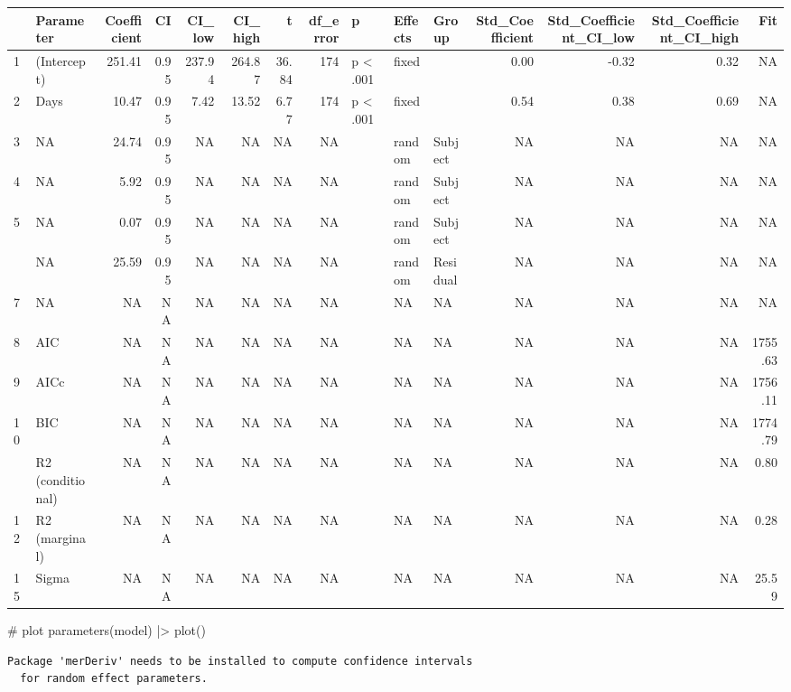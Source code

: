 \documentclass[
  letterpaper,
  DIV=11,
  numbers=noendperiod]{scrreprt}
\newenvironment{Shaded}{\begin{snugshade}}{\end{snugshade}}
\newcommand{\CommentTok}[1]{\textcolor[rgb]{0.37,0.37,0.37}{#1}}
\newcommand{\FunctionTok}[1]{\textcolor[rgb]{0.28,0.35,0.67}{#1}}
\newcommand{\NormalTok}[1]{\textcolor[rgb]{0.00,0.23,0.31}{#1}}
\newcommand{\SpecialCharTok}[1]{\textcolor[rgb]{0.37,0.37,0.37}{#1}}
\begin{document}
\begin{longtable*}[t]{llrrrrrrlllrrrr}
\toprule
 & Parameter & Coefficient & CI & CI\_low & CI\_high & t & df\_error & p & Effects & Group & Std\_Coefficient & Std\_Coefficient\_CI\_low & Std\_Coefficient\_CI\_high & Fit\\
 & (Intercept) & 251.41 & 0.95 & 237.94 & 264.87 & 36.84 & 174 & p < .001 & fixed &  & 0.00 & -0.32 & 0.32 & NA\\
2 & Days & 10.47 & 0.95 & 7.42 & 13.52 & 6.77 & 174 & p < .001 & fixed &  & 0.54 & 0.38 & 0.69 & NA\\
3 & NA & 24.74 & 0.95 & NA & NA & NA & NA &  & random & Subject & NA & NA & NA & NA\\
4 & NA & 5.92 & 0.95 & NA & NA & NA & NA &  & random & Subject & NA & NA & NA & NA\\
5 & NA & 0.07 & 0.95 & NA & NA & NA & NA &  & random & Subject & NA & NA & NA & NA\\
 & NA & 25.59 & 0.95 & NA & NA & NA & NA &  & random & Residual & NA & NA & NA & NA\\
7 & NA & NA & NA & NA & NA & NA & NA &  & NA & NA & NA & NA & NA & NA\\
8 & AIC & NA & NA & NA & NA & NA & NA &  & NA & NA & NA & NA & NA & 1755.63\\
9 & AICc & NA & NA & NA & NA & NA & NA &  & NA & NA & NA & NA & NA & 1756.11\\
10 & BIC & NA & NA & NA & NA & NA & NA &  & NA & NA & NA & NA & NA & 1774.79\\
 & R2 (conditional) & NA & NA & NA & NA & NA & NA &  & NA & NA & NA & NA & NA & 0.80\\
12 & R2 (marginal) & NA & NA & NA & NA & NA & NA &  & NA & NA & NA & NA & NA & 0.28\\
15 & Sigma & NA & NA & NA & NA & NA & NA &  & NA & NA & NA & NA & NA & 25.59\\
\bottomrule
\end{longtable*}

\begin{Shaded}
\begin{Highlighting}[]
\CommentTok{\# plot}
\FunctionTok{parameters}\NormalTok{(model) }\SpecialCharTok{|\textgreater{}}
  \FunctionTok{plot}\NormalTok{() }
\end{Highlighting}
\end{Shaded}

\begin{verbatim}
Package 'merDeriv' needs to be installed to compute confidence intervals
  for random effect parameters.
\end{verbatim}
\end{document}
